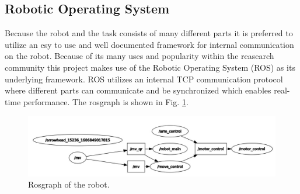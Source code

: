 \subsection{Robotic Operating System}
Because the robot and the task consists of many different parts it is preferred to utilize an esy to use and well documented framework for internal communication on the robot. Because of its many uses and popularity within the reasearch community this project makes use of the Robotic Operating System (ROS) as its underlying framework. 
ROS utilizes an internal TCP communication protocol where different parts can communicate and be synchronized which enables real-time performance. 
The rosgraph is shown in Fig. \ref{fig:rosgraph}. 

\begin{figure}
    \centering
    \includegraphics[width=0.7\columnwidth]{chapters/img/rosgraph.jpg}
    \caption{Rosgraph of the robot.}
    \label{fig:rosgraph}
\end{figure}



